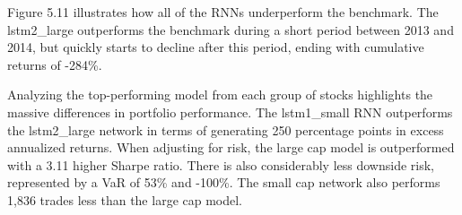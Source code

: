 \indent\newline 
Figure 5.11 illustrates how all of the RNNs underperform the benchmark. The lstm2\_large outperforms the benchmark during a short period between 2013 and 2014, but quickly starts to decline after this period, ending with cumulative returns of -284\%.
\indent\newline 
\begin{table}[ht]
\centering
{}
\caption{Comparison top models 50/50 long w/t.cost (2K, K=2)}
\end{table}
\indent\newline 
Analyzing the top-performing model from each group of stocks highlights the massive differences in portfolio performance. The lstm1\_small RNN outperforms the lstm2\_large network in terms of generating 250 percentage points in excess annualized returns. When adjusting for risk, the large cap model is outperformed with a 3.11 higher Sharpe ratio. There is also considerably less downside risk, represented by a VaR of 53\% and -100\%. The small cap network also performs 1,836 trades less than the large cap model.  

